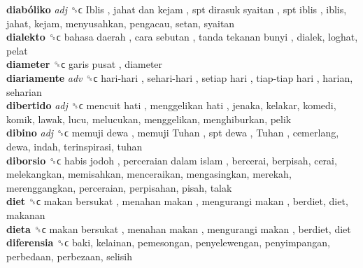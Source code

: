 \textbf{diabóliko} \emph{adj}  ␝ϲ   Iblis ,  jahat dan kejam ,  spt dirasuk syaitan ,  spt iblis , iblis, jahat, kejam, menyusahkan, pengacau, setan, syaitan  \\
\textbf{dialekto} ␝ϲ   bahasa daerah ,  cara sebutan ,  tanda tekanan bunyi , dialek, loghat, pelat  \\
\textbf{diameter} ␝ϲ   garis pusat , diameter  \\
\textbf{diariamente} \emph{adv}  ␝ϲ   hari-hari ,  sehari-hari ,  setiap hari ,  tiap-tiap hari , harian, seharian  \\
\textbf{dibertido} \emph{adj}  ␝ϲ   mencuit hati ,  menggelikan hati , jenaka, kelakar, komedi, komik, lawak, lucu, melucukan, menggelikan, menghiburkan, pelik  \\
\textbf{dibino} \emph{adj}  ␝ϲ   memuji dewa ,  memuji Tuhan ,  spt dewa ,  Tuhan , cemerlang, dewa, indah, terinspirasi, tuhan  \\
\textbf{diborsio} ␝ϲ   habis jodoh ,  perceraian dalam islam , bercerai, berpisah, cerai, melekangkan, memisahkan, menceraikan, mengasingkan, merekah, merenggangkan, perceraian, perpisahan, pisah, talak  \\
\textbf{diet} ␝ϲ   makan bersukat ,  menahan makan ,  mengurangi makan , berdiet, diet, makanan  \\
\textbf{dieta} ␝ϲ   makan bersukat ,  menahan makan ,  mengurangi makan , berdiet, diet  \\
\textbf{diferensia} ␝ϲ  baki, kelainan, pemesongan, penyelewengan, penyimpangan, perbedaan, perbezaan, selisih  \\
